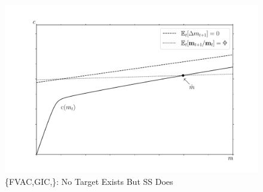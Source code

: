 \begin{figure}[tbp]
\centerline{\includegraphics[width=6in]{Figures/GICModFailsButGICRawHolds}}
\caption{\{{FVAC},{GIC},\}: No Target Exists But SS Does}
\label{fig:GICModFailsButGICRawHolds}
\end{figure}
